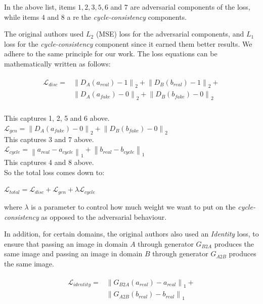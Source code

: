 \documentclass[10pt,twocolumn,letterpaper]{article}
\newcommand{\norm}[1]{\left\lVert#1\right\rVert}
\begin{document}
In the above list, items $1, 2, 3, 5, 6$ and $7$ are adversarial components of the loss, while items 
$4$ and $8$ a re the \textit{cycle-consistency} components.

The original authors used $L_2$ (MSE) loss for the adversarial components, and $L_1$ loss for the 
\textit{cycle-consistency} component since it earned them better results. We adhere to the same 
principle for our work. The loss equations can be mathematically written as follows:

\begin{align*}
\begin{split}
	\mathcal{L}_{disc} ={}& \norm{D_A(a_{real}) - 1}_2 + \norm{D_B(b_{real}) - 1}_2 + \\
							   	     & \norm{D_A(a_{fake}) - 0}_2 + \norm{D_B(b_{fake}) - 0}_2\\ 
\end{split}
\end{align*}

This captures 1, 2, 5 and 6 above.\\

$\mathcal{L}_{gen} = \norm{D_A(a_{fake}) - 0}_2 + \norm{D_B(b_{fake}) - 0}_2$ \\

This captures 3  and 7 above.\\

$\mathcal{L}_{cycle} = \norm{a_{real} - a_{cycle}}_1  + \norm{b_{real} - b_{cycle}}_1$ \\ 

This captures 4 and 8 above.\\

So the total loss comes down to:


$\mathcal{L}_{total} =\mathcal{L}_{disc} + \mathcal{L}_{gen} +	   
                       \lambda\mathcal{L}_{cycle}$


where $\lambda$ is a parameter to control how much weight we want to put on the \textit{cycle-consistency} as opposed to the adversarial behaviour.

In addition, for certain domains, the original authors \cite{cyclegan} also used an \textit{Identity} loss, to ensure that passing an image in domain $A$ through generator $G_{B2A}$ produces the same image and passing an image in domain $B$ through generator $G_{A2B}$ produces the same image.

\begin{align*}
\begin{split}
\mathcal{L}_{identity} ={}&\norm{G_{B2A}(a_{real}) - a_{real}}_1  + \\
						  &\norm{G_{A2B}(b_{real}) - b_{real}}_1 \\ 
\end{split}
\end{align*}
\end{document}
